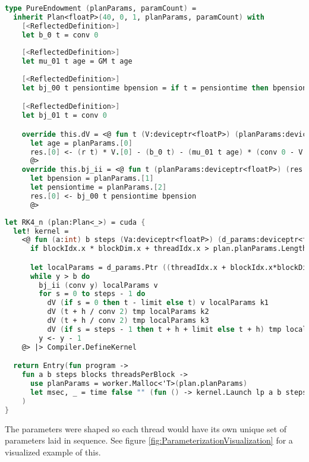 \begin{lstlisting}[language=FSharp, caption=Parameterized pure endowment life insurance plan in F\# Alea.cuBase, label=cubase_pureendowmentparams]
type PureEndowment (planParams, paramCount) =
  inherit Plan<floatP>(40, 0, 1, planParams, paramCount) with
    [<ReflectedDefinition>]
    let b_0 t = conv 0
    
    [<ReflectedDefinition>]
    let mu_01 t age = GM t age
    
    [<ReflectedDefinition>]
    let bj_00 t pensiontime bpension = if t = pensiontime then bpension else conv 0

    [<ReflectedDefinition>]
    let bj_01 t = conv 0

    override this.dV = <@ fun t (V:deviceptr<floatP>) (planParams:deviceptr<floatP>) (res:deviceptr<floatP>) -> 
      let age = planParams.[0]
      res.[0] <- (r t) * V.[0] - (b_0 t) - (mu_01 t age) * (conv 0 - V.[0] + (bj_01 t))
      @>
    override this.bj_ii = <@ fun t (planParams:deviceptr<floatP>) (res:deviceptr<floatP>) -> 
      let bpension = planParams.[1]                
      let pensiontime = planParams.[2]
      res.[0] <- bj_00 t pensiontime bpension
      @>
\end{lstlisting}

\begin{lstlisting}[language=FSharp, caption=Parameterized RK4\_n kernel changes in F\# Alea.cuBase, label=cubase_rk4nparams]
let RK4_n (plan:Plan<_>) = cuda {
  let! kernel =
    <@ fun (a:int) b steps (Va:deviceptr<floatP>) (d_params:deviceptr<floatP>) (result:deviceptr<floatP>) ->
      if blockIdx.x * blockDim.x + threadIdx.x > plan.planParams.Length/plan.paramCount then () else

      let localParams = d_params.Ptr ((threadIdx.x + blockIdx.x*blockDim.x)*plan.paramCount)
      while y > b do
        bj_ii (conv y) localParams v
        for s = 0 to steps - 1 do
          dV (if s = 0 then t - limit else t) v localParams k1
          dV (t + h / conv 2) tmp localParams k2
          dV (t + h / conv 2) tmp localParams k3
          dV (if s = steps - 1 then t + h + limit else t + h) tmp localParams k4
        y <- y - 1
    @> |> Compiler.DefineKernel 

  return Entry(fun program ->
    fun a b steps blocks threadsPerBlock ->
      use planParams = worker.Malloc<'T>(plan.planParams)
      let msec, _ = time false "" (fun () -> kernel.Launch lp a b steps Va.Ptr planParams.Ptr result.Ptr)
    )
}
\end{lstlisting}
\clearpage
The parameters were shaped so each thread would have its own unique set of parameters laid in sequence. 
See figure \ref{fig:ParameterizationVisualization} for a visualized example of this.

